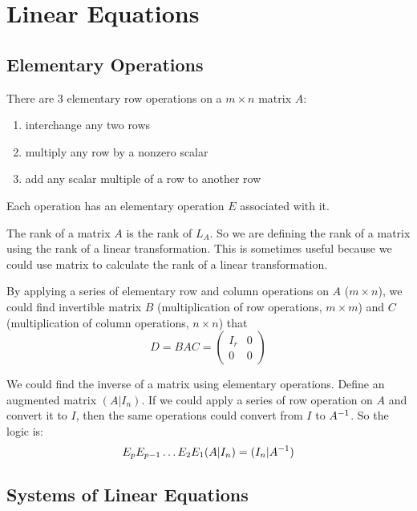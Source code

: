 \section{Linear Equations}

\subsection{Elementary Operations}

There are 3 elementary row operations on a $m \times n$ matrix $A$:
\begin{enumerate}
    \item interchange any two rows
    \item multiply any row by a nonzero scalar
    \item add any scalar multiple of a row to another row
\end{enumerate}

Each operation has an elementary operation $E$ associated with it.


The rank of a matrix $A$ is the rank of $L_A$. So we are defining the rank of a matrix using the rank of a linear transformation. This is sometimes useful because we could use matrix to calculate the rank of a linear transformation.

By applying a series of elementary row and column operations on $A$ ($m \times n$), we could find invertible matrix $B$ (multiplication of row operations, $m \times m$) and $C$ (multiplication of column operations, $n \times n$) that
\begin{equation*}
    D = B A C = \begin{pmatrix}
        I_r & 0 \\
        0 & 0
    \end{pmatrix}
\end{equation*}

We could find the inverse of a matrix using elementary operations. Define an augmented matrix $(A|I_n)$. If we could apply a series of row operation on $A$ and convert it to $I$, then the same operations could convert from $I$ to ${A}^{-1}$. So the logic is:
\begin{equation}
    E_p E_{p-1} \hdots E_2 E_1 (A|I_n) = (I_n | {A}^{-1} )
\end{equation}


\subsection{Systems of Linear Equations}

